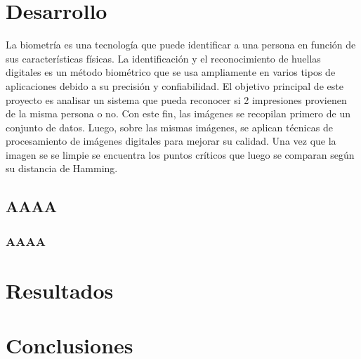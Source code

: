 \documentclass[preprint,12pt]{elsarticle}
\begin{document}
\begin{multicols}{2} 

\section{Desarrollo} 
La biometría es una tecnología que puede identificar a una persona en función de sus características físicas. La identificación y el reconocimiento de huellas digitales es un método biométrico que se usa ampliamente en varios tipos de aplicaciones debido a su precisión y confiabilidad. El objetivo principal de este proyecto es analisar un sistema que pueda reconocer si 2 impresiones provienen de la misma persona o no. Con este fin, las imágenes se recopilan primero de un conjunto de datos. Luego, sobre las mismas imágenes, se aplican técnicas de procesamiento de imágenes digitales para mejorar su calidad. Una vez que la imagen se se limpie se encuentra los puntos críticos que luego se comparan según su distancia de Hamming.

\subsection{AAAA} 
	\subsubsection{AAAA} 





\section{Resultados}

\cite{Gartner} 





\section{Conclusiones}


\end{multicols}
\end{document}
